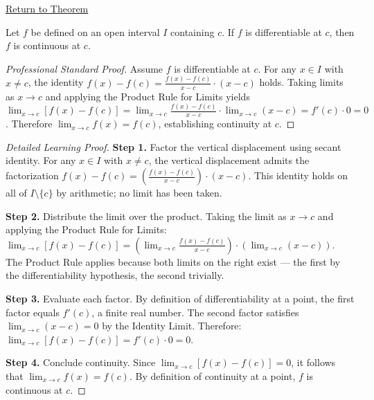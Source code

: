 \newpage
{}
\label{prf:differentiable-implies-continuous}

\begin{remark*}[Return]
\hyperref[thm:differentiable-implies-continuous]{Return to Theorem}
\end{remark*}

\begin{theorem*}
Let $f$ be defined on an open interval $I$ containing $c$. If $f$ is differentiable at $c$, then $f$ is continuous at $c$.
\end{theorem*}

\begin{proof}[Professional Standard Proof]
\LRAProofBodyStart
Assume $f$ is differentiable at $c$. For any $x \in I$ with $x \neq c$, the identity $f(x) - f(c) = \frac{f(x) - f(c)}{x - c} \cdot (x - c)$ holds. Taking limits as $x \to c$ and applying the Product Rule for Limits yields $\lim_{x \to c}[f(x) - f(c)] = \lim_{x \to c}\frac{f(x) - f(c)}{x - c} \cdot \lim_{x \to c}(x - c) = f'(c) \cdot 0 = 0$. Therefore $\lim_{x \to c} f(x) = f(c)$, establishing continuity at $c$.
\end{proof}

\begin{proof}[Detailed Learning Proof]
\LRAProofBodyStart

\textbf{Step 1.} Factor the vertical displacement using secant identity. For any $x \in I$ with $x \neq c$, the vertical displacement admits the factorization $f(x) - f(c) = \left(\frac{f(x) - f(c)}{x - c}\right) \cdot (x - c)$. This identity holds on all of $I \setminus \{c\}$ by arithmetic; no limit has been taken.

\textbf{Step 2.} Distribute the limit over the product. Taking the limit as $x \to c$ and applying the Product Rule for Limits: $\lim_{x \to c} [f(x) - f(c)] = \left(\lim_{x \to c} \frac{f(x) - f(c)}{x - c}\right) \cdot \left(\lim_{x \to c} (x - c)\right)$. The Product Rule applies because both limits on the right exist --- the first by the differentiability hypothesis, the second trivially.

\textbf{Step 3.} Evaluate each factor. By definition of differentiability at a point, the first factor equals $f'(c)$, a finite real number. The second factor satisfies $\lim_{x \to c}(x - c) = 0$ by the Identity Limit. Therefore: $\lim_{x \to c} [f(x) - f(c)] = f'(c) \cdot 0 = 0$.

\textbf{Step 4.} Conclude continuity. Since $\lim_{x \to c}[f(x) - f(c)] = 0$, it follows that $\lim_{x \to c} f(x) = f(c)$. By definition of continuity at a point, $f$ is continuous at $c$.
\end{proof}

